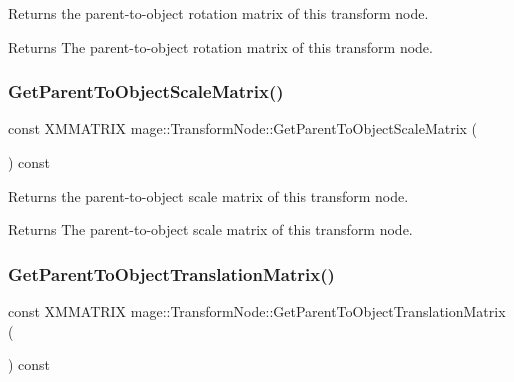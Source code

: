 Returns the parent-\/to-\/object rotation matrix of this transform node.

\begin{DoxyReturn}{Returns}
The parent-\/to-\/object rotation matrix of this transform node. 
\end{DoxyReturn}
\hypertarget{classmage_1_1_transform_node_a99da2ec9e52fdfc1e9279f1e3fc2fc15}{}\label{classmage_1_1_transform_node_a99da2ec9e52fdfc1e9279f1e3fc2fc15} 
\subsubsection{\texorpdfstring{Get\+Parent\+To\+Object\+Scale\+Matrix()}{GetParentToObjectScaleMatrix()}}
{\footnotesize\ttfamily const X\+M\+M\+A\+T\+R\+IX mage\+::\+Transform\+Node\+::\+Get\+Parent\+To\+Object\+Scale\+Matrix (\begin{DoxyParamCaption}{ }\end{DoxyParamCaption}) const}

Returns the parent-\/to-\/object scale matrix of this transform node.

\begin{DoxyReturn}{Returns}
The parent-\/to-\/object scale matrix of this transform node. 
\end{DoxyReturn}
\hypertarget{classmage_1_1_transform_node_ae2d0f336a5567a585c15895da26ce0c6}{}\label{classmage_1_1_transform_node_ae2d0f336a5567a585c15895da26ce0c6} 
\subsubsection{\texorpdfstring{Get\+Parent\+To\+Object\+Translation\+Matrix()}{GetParentToObjectTranslationMatrix()}}
{\footnotesize\ttfamily const X\+M\+M\+A\+T\+R\+IX mage\+::\+Transform\+Node\+::\+Get\+Parent\+To\+Object\+Translation\+Matrix (\begin{DoxyParamCaption}{ }\end{DoxyParamCaption}) const}

